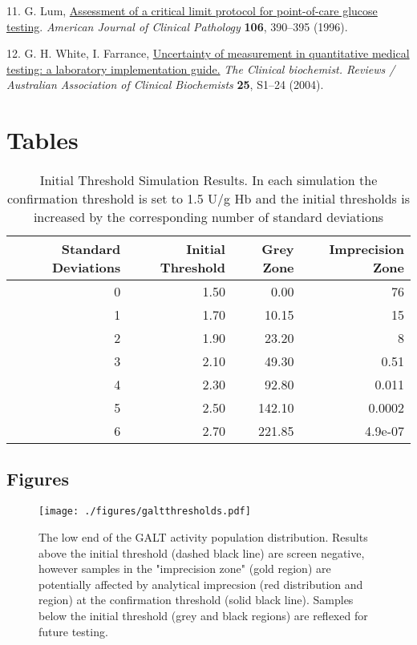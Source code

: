\documentclass[review]{elsarticle}
\begin{document}
\hypertarget{citeproc_bib_item_11}{11.  G. Lum, \href{https://doi.org/10.1093/ajcp/106.3.390}{Assessment of a critical limit protocol for point-of-care glucose testing}. \textit{American Journal of Clinical Pathology} \textbf{106}, 390–395 (1996).}

\hypertarget{citeproc_bib_item_12}{12.  G. H. White, I. Farrance, \href{https://www.ncbi.nlm.nih.gov/pubmed/18650962}{Uncertainty of measurement in quantitative medical testing: a laboratory implementation guide.} \textit{The Clinical biochemist. Reviews / Australian Association of Clinical Biochemists} \textbf{25}, S1–24 (2004).}
\clearpage 

\section*{Tables}
\label{sec:orgdfbb57a}

\begin{table}[ht]
\centering
\begin{tabular}{rrrr}
  \hline
Standard Deviations & Initial Threshold & Grey Zone & Imprecision Zone \\ 
  \hline
  0 & 1.50 & 0.00 &  76 \\ 
    1 & 1.70 & 10.15 &  15 \\ 
    2 & 1.90 & 23.20 &   8 \\ 
    3 & 2.10 & 49.30 & 0.51 \\ 
    4 & 2.30 & 92.80 & 0.011 \\ 
    5 & 2.50 & 142.10 & 0.0002 \\ 
    6 & 2.70 & 221.85 & 4.9e-07 \\ 
   \hline
\end{tabular}
\caption{Initial Threshold Simulation Results. In each simulation the confirmation threshold is set to 1.5 U/g Hb and the initial thresholds is increased by the corresponding number of standard deviations} 
\label{tab:imprecision}
\end{table}

\clearpage

\subsection*{Figures}
\label{sec:org5c5c4d9}

\begin{figure}[htbp]
\centering
\texttt{[image: ./figures/galtthresholds.pdf]}
\caption{\label{fig:orgb0e33ce}The low end of the GALT activity population distribution. Results above the initial threshold (dashed black line) are screen negative, however samples in the "imprecision zone" (gold region) are potentially affected by analytical imprecsion (red distribution and region) at the confirmation threshold (solid black line). Samples below the initial threshold (grey and black regions) are reflexed for future testing.}
\end{figure}
\end{document}
